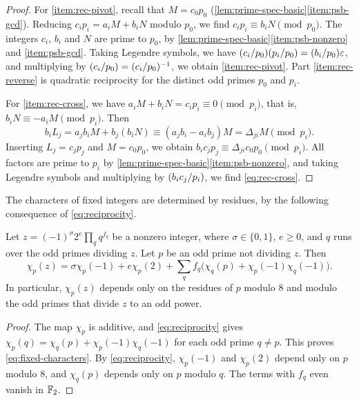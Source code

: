 \begin{proof}
For \ref{item:rec-pivot}, recall that $M=c_0p_0$ (\cref{lem:prime-spec-basic}\ref{item:psb-gcd}). Reducing $c_ip_i=a_iM+b_iN$ modulo $p_0$, we find $c_ip_i\equiv b_iN\pmod{p_0}$. The integers $c_i$, $b_i$ and $N$ are prime to $p_0$, by \cref{lem:prime-spec-basic}\ref{item:psb-nonzero} and \ref{item:psb-gcd}. Taking Legendre symbols, we have $\leg{c_i}{p_0}\leg{p_i}{p_0}=\leg{b_i}{p_0}\eps$, and multiplying by $\leg{c_i}{p_0}=\leg{c_i}{p_0}^{-1}$, we obtain \ref{item:rec-pivot}. Part \ref{item:rec-reverse} is quadratic reciprocity for the distinct odd primes $p_0$ and $p_i$.

For \ref{item:rec-cross}, we have $a_iM+b_iN=c_ip_i\equiv0\pmod{p_i}$, that is, $b_iN\equiv-a_iM\pmod{p_i}$. Then
\begin{equation}
b_iL_j=a_jb_iM+b_j(b_iN)\equiv(a_jb_i-a_ib_j)M=\Delta_{ji}M\pmod{p_i}.
\end{equation}
Inserting $L_j=c_jp_j$ and $M=c_0p_0$, we obtain $b_ic_jp_j\equiv\Delta_{ji}c_0p_0\pmod{p_i}$. All factors are prime to $p_i$ by \cref{lem:prime-spec-basic}\ref{item:psb-nonzero}, and taking Legendre symbols and multiplying by $\leg{b_ic_j}{p_i}$, we find \eqref{eq:rec-cross}.
\end{proof}

The characters of fixed integers are determined by residues, by the following consequence of \eqref{eq:reciprocity}.

\begin{lemma}\label{lem:fixed-characters}
Let $z=(-1)^\sigma2^e\prod_qq^{f_q}$ be a nonzero integer, where $\sigma\in\{0,1\}$, $e\ge0$, and $q$ runs over the odd primes dividing $z$. Let $p$ be an odd prime not dividing $z$. Then
\begin{equation}\label{eq:fixed-characters}
\chi_p(z)=\sigma\chi_p(-1)+e\chi_p(2)+\sum_qf_q\bigl(\chi_q(p)+\chi_p(-1)\chi_q(-1)\bigr).
\end{equation}
In particular, $\chi_p(z)$ depends only on the residues of $p$ modulo $8$ and modulo the odd primes that divide $z$ to an odd power.
\end{lemma}

\begin{proof}
The map $\chi_p$ is additive, and \eqref{eq:reciprocity} gives $\chi_p(q)=\chi_q(p)+\chi_p(-1)\chi_q(-1)$ for each odd prime $q\ne p$. This proves \eqref{eq:fixed-characters}. By \eqref{eq:reciprocity}, $\chi_p(-1)$ and $\chi_p(2)$ depend only on $p$ modulo $8$, and $\chi_q(p)$ depends only on $p$ modulo $q$. The terms with $f_q$ even vanish in $\mathbb F_2$.
\end{proof}

